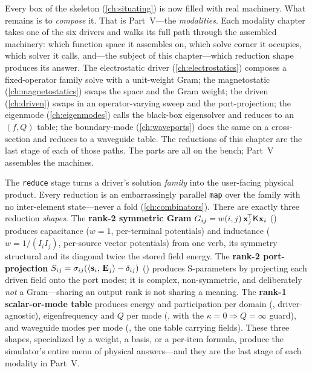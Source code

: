 Every box of the skeleton (\cref{ch:situating}) is now filled with real
machinery. What remains is to \emph{compose} it. That is Part~V---the
\emph{modalities}. Each modality chapter takes one of the six drivers and walks
its full path through the assembled machinery: which function space it assembles
on, which solve corner it occupies, which solver it calls, and---the subject of
this chapter---which reduction shape produces its answer. The electrostatic
driver (\cref{ch:electrostatics}) composes a fixed-operator family solve with a
unit-weight Gram; the magnetostatic (\cref{ch:magnetostatics}) swaps the space
and the Gram weight; the driven (\cref{ch:driven}) swaps in an operator-varying
sweep and the port-projection; the eigenmode (\cref{ch:eigenmodes}) calls the
black-box eigensolver and reduces to an $(f,Q)$ table; the boundary-mode
(\cref{ch:waveports}) does the same on a cross-section and reduces to a waveguide
table. The reductions of this chapter are the last stage of each of those paths.
The parts are all on the bench; Part~V assembles the machines.

\summarysection
The \texttt{reduce} stage turns a driver's solution \emph{family} into the
user-facing physical product. Every reduction is an embarrassingly parallel
\texttt{map} over the family with no inter-element state---never a fold
(\cref{ch:combinators}). There are exactly three reduction \emph{shapes}. The
\textbf{rank-2 symmetric Gram} $G_{ij}=w(i,j)\,\mathbf{x}_j^{\!\top}\mathsf{K}\mathbf{x}_i$
() produces capacitance ($w=1$, per-terminal potentials) and
inductance ($w=1/(I_iI_j)$, per-source vector potentials) from one verb, its
symmetry structural and its diagonal twice the stored field energy. The
\textbf{rank-2 port-projection}
$S_{ij}=\sigma_{ij}(\left\langle \mathbf{s}_i,\, \mathbf{E}_j\right\rangle-\delta_{ij})$
() produces S-parameters by projecting each driven field
onto the port modes; it is complex, non-symmetric, and deliberately \emph{not} a
Gram---sharing an output rank is not sharing a meaning. The \textbf{rank-1
scalar-or-mode table} produces energy and participation per domain
(, driver-agnostic), eigenfrequency and $Q$ per mode
(, with the $\kappa{=}0\Rightarrow Q{=}\infty$
guard), and waveguide modes per mode (, the one
table carrying fields). These three shapes, specialized by a weight, a basis, or
a per-item formula, produce the simulator's entire menu of physical answers---and
they are the last stage of each modality in Part~V.


